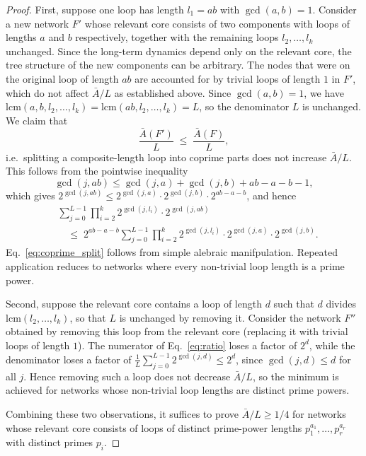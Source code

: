 \documentclass[11pt, reqno]{elsarticle}%
\theoremstyle{plain}
\begin{document}
\begin{proof}
First, suppose one loop has length $l_1 = ab$ with $\gcd(a,b)=1$. 
Consider a new network $F'$ whose relevant core consists of two 
components with loops of lengths $a$ and $b$ respectively, together 
with the remaining loops $l_2,\ldots,l_k$ unchanged. Since the 
long-term dynamics depend only on the relevant core, the tree 
structure of the new components can be arbitrary. The nodes that 
were on the original loop of length $ab$ are accounted for by 
trivial loops of length $1$ in $F'$, which do not affect $\bar{A}/L$ 
as established above. Since $\gcd(a,b)=1$, we have 
$\mathrm{lcm}(a,b,l_2,\ldots,l_k) = \mathrm{lcm}(ab,l_2,\ldots,l_k) 
= L$, so the denominator $L$ is unchanged. We claim that
\begin{equation}
  \frac{\bar{A}(F')}{L} \;\le\; \frac{\bar{A}(F)}{L},
  \label{eq:coprime_split}
\end{equation}
i.e.\ splitting a composite-length loop into coprime parts does 
not increase $\bar{A}/L$. This follows from the pointwise 
inequality
\begin{equation}
  \gcd(j,ab) \le \gcd(j,a) + \gcd(j,b) + ab - a - b - 1,
\end{equation}
which gives 
$2^{\gcd(j,ab)}\le 2^{\gcd(j,a)}\cdot 2^{\gcd(j,b)}\cdot 
2^{ab-a-b}$, and hence
\begin{align}
  &\sum_{j=0}^{L-1}\prod_{i=2}^k 2^{\gcd(j,l_i)}\cdot 
  2^{\gcd(j,ab)} \nonumber\\
  &\quad\le\;
  2^{ab-a-b}\sum_{j=0}^{L-1}\prod_{i=2}^k 
  2^{\gcd(j,l_i)}\cdot 2^{\gcd(j,a)}\cdot 2^{\gcd(j,b)}.
\end{align}
Eq.~\eqref{eq:coprime_split} follows from simple alebraic manifpulation.
Repeated application 
reduces to networks where every non-trivial loop length is a 
prime power.

Second, suppose the relevant core contains a loop of length $d$ 
such that $d$ divides $\mathrm{lcm}(l_2,\ldots,l_k)$, so that 
$L$ is unchanged by removing it. Consider the network $F''$ 
obtained by removing this loop from the relevant core (replacing 
it with  trivial loops of length $1$). The numerator of 
Eq.~\eqref{eq:ratio} loses a factor of $2^d$, while the 
denominator loses a factor of 
$\frac{1}{L}\sum_{j=0}^{L-1} 2^{\gcd(j,d)} \le 2^d$, 
since $\gcd(j,d) \le d$ for all $j$. Hence removing such a loop 
does not decrease $\bar{A}/L$, so the minimum is achieved for 
networks whose non-trivial loop lengths are distinct prime powers.

Combining these two observations, it suffices to prove 
$\bar{A}/L \ge 1/4$ for networks whose relevant core consists 
of loops of distinct prime-power lengths 
$p_1^{a_1},\ldots,p_r^{a_r}$ with distinct primes $p_i$.


\end{proof}
\end{document}
